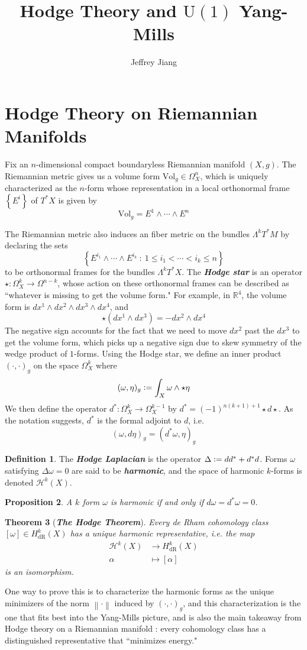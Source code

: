 \documentclass[psamsfonts, 12pt]{amsart}
\newtheorem{thm}{Theorem}[section]
\newtheorem{prop}[thm]{Proposition}
\theoremstyle{definition}
\newtheorem{defn}[thm]{Definition}
\theoremstyle{remark}
\newcommand{\R}{\mathbb{R}}
\newcommand{\ib}[1]{\textbf{\textit{#1}}}
\newcommand{\set}[1]{\left\lbrace #1 \right\rbrace}
\newcommand{\norm}[1]{\left\lVert#1\right\rVert}
\newcommand{\defeq}{\vcentcolon=}
\begin{document}
%
\author{Jeffrey Jiang}
%
\title{Hodge Theory and $\mathrm{U}(1)$ Yang-Mills}
%
\maketitle
%
\section{Hodge Theory on Riemannian Manifolds}
%
Fix an $n$-dimensional compact boundaryless Riemannian manifold $(X,g)$. The Riemannian
metric gives us a volume form $\mathrm{Vol}_g \in \Omega^n_X$, which is uniquely
characterized as the $n$-form whose representation in a local orthonormal frame
$\set{E^i}$ of $T^*X$ is given by
\[
\mathrm{Vol}_g = E^1 \wedge\cdots\wedge E^n
\]

The Riemannian metric also induces an fiber metric on the bundles $\Lambda^kT^*M$ by
declaring the sets
\[
\set{E^{i_1} \wedge \cdots \wedge E^{i_k} ~:~ 1 \leq i_1 < \cdots < i_k \leq n}
\]
to be orthonormal frames for the bundles $\Lambda^kT^*X$. The \ib{Hodge star}
is an operator $\star : \Omega^k_X \to \Omega^{n-k}$, whose action on these
orthonormal frames can be described as ``whatever is missing to get the volume form."
For example, in $\R^4$, the volume form is $dx^1 \wedge dx^2 \wedge dx^3 \wedge dx^4$,
and
\[
\star(dx^1\wedge dx^3) = -dx^2\wedge dx^4
\]
The negative sign accounts for the fact that we need to move $dx^2$ past
the $dx^3$ to get the volume form, which picks up a negative sign due to
skew symmetry of the wedge product of $1$-forms. Using the Hodge star, we
define an inner product $(\cdot,\cdot)_g$ on the space $\Omega^k_X$ where
\[
(\omega,\eta)_g \defeq \int_X \omega\wedge\star\eta
\]
We then define the operator $d^* : \Omega^k_X \to \Omega^{k-1}_X$ by
$d^* = (-1)^{n(k+1)+1}\star d\star$. As the notation suggests, $d^*$ is the formal
adjoint to $d$, i.e.
\[
(\omega,d\eta)_g = (d^*\omega,\eta)_g
\]
%
\begin{defn}
The \ib{Hodge Laplacian} is the operator $\Delta \defeq dd^* + d^*d$. Forms $\omega$
satisfying $\Delta\omega = 0$ are said to be \ib{harmonic}, and the space
of harmonic $k$-forms is denoted $\mathcal{H}^k(X)$.
\end{defn}
%
\begin{prop}
A $k$ form $\omega$ is harmonic if and only if $d\omega = d^*\omega = 0$.
\end{prop}
%
\begin{thm}[\ib{The Hodge Theorem}]
Every de Rham cohomology class $[\omega] \in H^k_{\mathrm{dR}}(X)$ has a unique
harmonic representative, i.e. the map
\begin{align*}
\mathcal{H}^k(X) &\to H^k_{\mathrm{dR}}(X) \\
\alpha &\mapsto [\alpha]
\end{align*}
is an isomorphism.
\end{thm}
%
One way to prove this is to characterize the harmonic forms as the unique minimizers of
the norm $\norm{\cdot}$ induced by $(\cdot,\cdot)_g$, and this characterization
is the one that fits best into the Yang-Mills picture, and is also the main
takeaway from Hodge theory on a Riemannian manifold : every cohomology class has
a distinguished representative that ``minimizes energy."
%
\end{document}
